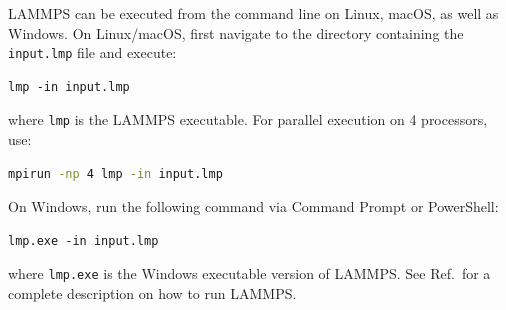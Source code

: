 \documentclass[9pt,tutorial]{livecoms}
\newcommand{\flecmd}[1]{\textcolor{command}{\texttt{#1}}} %
\begin{document}
\begin{appendices}
LAMMPS can be executed from the command line on Linux, macOS,
as well as Windows.  On Linux/macOS, first navigate to the directory containing
the \flecmd{input.lmp} file and execute:
\begin{lstlisting}
lmp -in input.lmp
\end{lstlisting}
where \flecmd{lmp} is the LAMMPS executable.
For parallel execution on 4 processors, use:
\begin{lstlisting}[language=bash]
mpirun -np 4 lmp -in input.lmp
\end{lstlisting}
On Windows, run the following command via Command Prompt or PowerShell:
\begin{lstlisting}
lmp.exe -in input.lmp
\end{lstlisting}
where \flecmd{lmp.exe} is the Windows executable version of LAMMPS.  See
Ref.\, for a complete description on how to run
LAMMPS.

\end{appendices}
\end{document}
